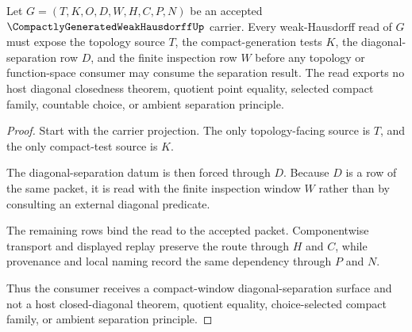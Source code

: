 \begin{theorem}
\label{thm:compactly-generated-weak-hausdorff-diagonal-separation}
Let $G=(T,K,O,D,W,H,C,P,N)$ be an accepted $\CompactlyGeneratedWeakHausdorffUp$ carrier. Every weak-Hausdorff read of $G$ must expose the topology source $T$, the compact-generation tests $K$, the diagonal-separation row $D$, and the finite inspection row $W$ before any topology or function-space consumer may consume the separation result. The read exports no host diagonal closedness theorem, quotient point equality, selected compact family, countable choice, or ambient separation principle.
\end{theorem}
\begin{proof}
Start with the carrier projection. The only topology-facing source is $T$, and the only compact-test source is $K$.

The diagonal-separation datum is then forced through $D$. Because $D$ is a row of the same packet, it is read with the finite inspection window $W$ rather than by consulting an external diagonal predicate.

The remaining rows bind the read to the accepted packet. Componentwise transport and displayed replay preserve the route through $H$ and $C$, while provenance and local naming record the same dependency through $P$ and $N$.

Thus the consumer receives a compact-window diagonal-separation surface and not a host closed-diagonal theorem, quotient equality, choice-selected compact family, or ambient separation principle.
\end{proof}


